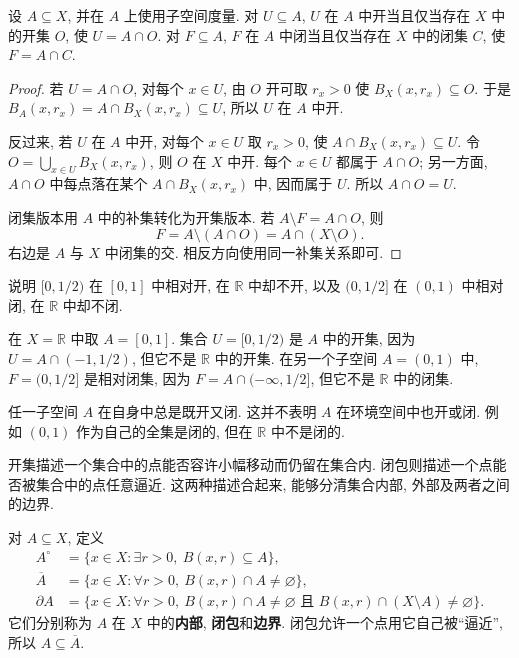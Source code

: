 \begin{theorem}[子空间中的开闭集]\label{ch:seq:subspace-open}
设 $A\subseteq X$, 并在 $A$ 上使用子空间度量. 对 $U\subseteq A$, $U$ 在 $A$ 中开当且仅当存在 $X$ 中的开集 $O$, 使 $U=A\cap O$. 对 $F\subseteq A$, $F$ 在 $A$ 中闭当且仅当存在 $X$ 中的闭集 $C$, 使 $F=A\cap C$.
\end{theorem}
\begin{proof}
若 $U=A\cap O$, 对每个 $x\in U$, 由 $O$ 开可取 $r_x>0$ 使 $B_X(x,r_x)\subseteq O$. 于是
$B_A(x,r_x)=A\cap B_X(x,r_x)\subseteq U$, 所以 $U$ 在 $A$ 中开.

反过来, 若 $U$ 在 $A$ 中开, 对每个 $x\in U$ 取 $r_x>0$, 使 $A\cap B_X(x,r_x)\subseteq U$. 令 $O=\bigcup_{x\in U}B_X(x,r_x)$, 则 $O$ 在 $X$ 中开. 每个 $x\in U$ 都属于 $A\cap O$; 另一方面, $A\cap O$ 中每点落在某个 $A\cap B_X(x,r_x)$ 中, 因而属于 $U$. 所以 $A\cap O=U$.

闭集版本用 $A$ 中的补集转化为开集版本. 若 $A\setminus F=A\cap O$, 则
\[
 F=A\setminus(A\cap O)=A\cap(X\setminus O).
\]
右边是 $A$ 与 $X$ 中闭集的交. 相反方向使用同一补集关系即可.
\end{proof}

\begin{example}
说明 $[0,1/2)$ 在 $[0,1]$ 中相对开, 在 $\mathbb{R}$ 中却不开, 以及 $(0,1/2]$ 在 $(0,1)$ 中相对闭, 在 $\mathbb{R}$ 中却不闭.
\end{example}
\begin{solution}
在 $X=\mathbb{R}$ 中取 $A=[0,1]$. 集合 $U=[0,1/2)$ 是 $A$ 中的开集, 因为 $U=A\cap(-1,1/2)$, 但它不是 $\mathbb{R}$ 中的开集. 在另一个子空间 $A=(0,1)$ 中, $F=(0,1/2]$ 是相对闭集, 因为 $F=A\cap(-\infty,1/2]$, 但它不是 $\mathbb{R}$ 中的闭集.

任一子空间 $A$ 在自身中总是既开又闭. 这并不表明 $A$ 在环境空间中也开或闭. 例如 $(0,1)$ 作为自己的全集是闭的, 但在 $\mathbb{R}$ 中不是闭的.
\end{solution}

\label{ch:seq:closure}
开集描述一个集合中的点能否容许小幅移动而仍留在集合内. 闭包则描述一个点能否被集合中的点任意逼近. 这两种描述合起来, 能够分清集合内部, 外部及两者之间的边界.

\begin{definition}[内部, 闭包与边界]\label{ch:seq:def-closure}
对 $A\subseteq X$, 定义
\begin{align*}
 A^\circ&=\{x\in X:\exists r>0,\ B(x,r)\subseteq A\},\\
 \overline A&=\{x\in X:\forall r>0,\ B(x,r)\cap A\ne\varnothing\},\\
 \partial A&=\{x\in X:\forall r>0,\ B(x,r)\cap A\ne\varnothing
             \text{ 且 }B(x,r)\cap(X\setminus A)\ne\varnothing\}.
\end{align*}
它们分别称为 $A$ 在 $X$ 中的\textbf{内部}, \textbf{闭包}和\textbf{边界}. 闭包允许一个点用它自己被``逼近'', 所以 $A\subseteq\overline A$.
\end{definition}

